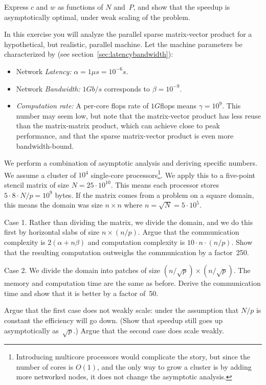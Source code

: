 \begin{exercise}
  Express $c$ and $w$ as functions of $N$ and~$P$, and show that the
  speedup is asymptotically optimal, under weak scaling of the problem.
\end{exercise}

\begin{exercise}
  \label{ex:scale-2d-domain}
  In this exercise you will analyze the parallel sparse matrix-vector
  product for a hypothetical, but realistic, parallel machine.
  Let the machine parameters be characterized by (see
  section~\ref{sec:latencybandwidth}):
  \begin{itemize}
  \item Network {\it Latency:} $\alpha=1\mu s=10^{-6}s$.
  \item Network {\it Bandwidth:} $1Gb/s$ corresponds to $\beta=10^{-9}$.
  \item {\it Computation rate:} A per-core flops rate of $1G$flops
    means $\gamma=10^9$. This number may seem low, but note that the
    matrix-vector product has less reuse than the matrix-matrix
    product, which can achieve close to peak performance,
    and that the sparse matrix-vector product is even more
    bandwidth-bound.
  \end{itemize}
  We perform a combination of asymptotic analysis and deriving specific numbers.
  We assume a cluster of 
  $10^4$ single-core processors\footnote
  {Introducing multicore processors would complicate the story, but
    since the number of cores is $O(1)$, and the only way to grow a
    cluster is by adding more networked nodes, it does not change the
    asymptotic analysis.}. We apply this to a five-point
  stencil matrix of size $N=25\cdot 10^{10}$. This means each
  processor stores $5\cdot 8\cdot N/p=10^9$ bytes. If the matrix comes
  from a problem on a square domain, this means the domain was size
  $n\times n$ where $n=\sqrt N=5\cdot 10^5$.

  Case 1. Rather than dividing the matrix, we divide the domain, and
  we do this first by horizontal slabs of size $n\times (n/p)$. Argue
  that the communication complexity is $2(\alpha+n\beta)$ and
  computation complexity is $10\cdot n\cdot (n/p)$. Show that the
  resulting computation outweighs the communication by a factor~250.

  Case 2. We divide the domain into patches of size
  $(n/\sqrt p)\times (n/\sqrt p)$.
  The memory and computation time are the same as
  before. Derive the communication time and show that it is better by
  a factor of~50. 

  Argue that the first case does not weakly scale: under the
  assumption that $N/p$ is constant the efficiency will go down. 
  (Show that speedup still goes up asymptotically as~$\sqrt p$.)
  Argue that the second case does scale weakly.
\end{exercise}

